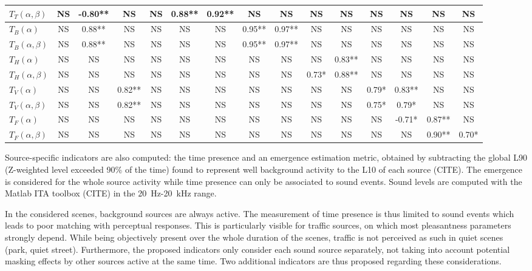 \documentclass{article}
\begin{document}
\begin{sloppy}
\begin{table}[ht!]
{\begin{tabular}{ l | c c c c c c c c c c c c c c }
	$T_T(\alpha, \beta)$ & NS & -0.80** & NS & NS & 0.88** & 0.92** & NS & NS & NS & NS & NS & NS & NS & NS \\ \hline
	$T_B(\alpha)$ & NS & 0.88** & NS & NS & NS & NS & 0.95** & 0.97** & NS & NS & NS & NS & NS & NS \\
	$T_B(\alpha, \beta)$ & NS & 0.88** & NS & NS & NS & NS & 0.95** & 0.97** & NS & NS & NS & NS & NS & NS \\ \hline
	$T_H(\alpha)$ & NS & NS & NS & NS & NS & NS & NS & NS & NS & 0.83** & NS & NS & NS & NS \\
	$T_H(\alpha, \beta)$ & NS & NS & NS & NS & NS & NS & NS & NS & 0.73* & 0.88** & NS & NS & NS & NS \\ \hline
	$T_V(\alpha)$ & NS & NS & 0.82** & NS & NS & NS & NS & NS & NS & NS & 0.79* & 0.83** & NS & NS \\
	$T_V(\alpha, \beta)$ & NS & NS & 0.82** & NS & NS & NS & NS & NS & NS & NS & 0.75* & 0.79* & NS & NS \\ \hline
	$T_F(\alpha)$ & NS & NS & NS & NS & NS & NS & NS & NS & NS & NS & NS & -0.71* & 0.87** & NS \\
	$T_F(\alpha, \beta)$ & NS & NS & NS & NS & NS & NS & NS & NS & NS & NS & NS & NS & 0.90** & 0.70* \\ \hline
\end{tabular}
}
\end{table}

Source-specific indicators are also computed: the time presence and an emergence estimation metric, obtained by subtracting the global L90 (Z-weighted level exceeded 90\% of the time) found to represent well background activity to the L10 of each source (CITE). The emergence is considered for the whole source activity while time presence can only be associated to sound events. Sound levels are computed with the Matlab ITA toolbox (CITE) in the 20~Hz-20~kHz range.

In the considered scenes, background sources are always active. The measurement of time presence is thus limited to sound events which leads to poor matching with perceptual responses. This is particularly visible for traffic sources, on which most pleasantness parameters strongly depend. While being objectively present over the whole duration of the scenes, traffic is not perceived as such in quiet scenes (park, quiet street). Furthermore, the proposed indicators only consider each sound source separately, not taking into account potential masking effects by other sources active at the same time. Two additional indicators are thus proposed regarding these considerations.


\end{sloppy}
\end{document}
